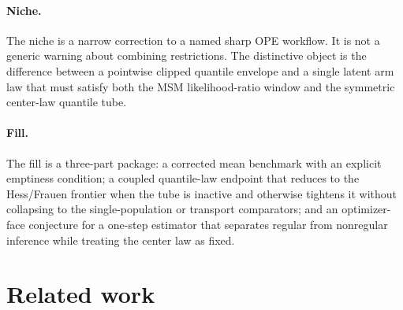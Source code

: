 \documentclass{article}
\begin{document}
\paragraph{Niche.} The niche is a narrow correction to a named sharp OPE workflow. It is not a generic warning about combining restrictions. The distinctive object is the difference between a pointwise clipped quantile envelope and a single latent arm law that must satisfy both the MSM likelihood-ratio window and the symmetric center-law quantile tube.

\paragraph{Fill.} The fill is a three-part package: a corrected mean benchmark with an explicit emptiness condition; a coupled quantile-law endpoint that reduces to the Hess/Frauen frontier when the tube is inactive and otherwise tightens it without collapsing to the single-population or transport comparators; and an optimizer-face conjecture for a one-step estimator that separates regular from nonregular inference while treating the center law as fixed.

\section{Related work}
\end{document}
